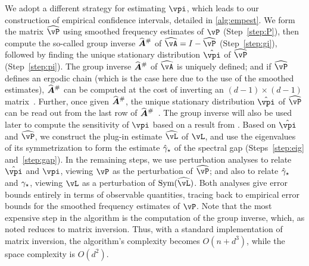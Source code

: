 We adopt a different strategy for estimating $\vpi$, which leads to
our construction of empirical confidence intervals, detailed in
\cref{alg:empest}.
We form the matrix $\wh\vP$ using smoothed frequency estimates of
$\vP$ (Step~\ref{step:P}), then compute the so-called group inverse
$\giAh$ of $\wh\vA = I - \wh\vP$ (Step~\ref{step:gi}), followed by
finding the unique stationary distribution $\hat\vpi$ of $\wh\vP$
(Step~\ref{step:pi}).
The group inverse $\giAh$ of $\wh\vA$ is uniquely defined; and if
$\wh\vP$ defines an ergodic chain (which is the case here due to the
use of the smoothed estimates), $\giAh$ can be computed at the cost of
inverting an $(d-1)\times (d-1)$ matrix~\citep[Theorem
5.2]{meyer1975role}.
Further, once given $\giAh$, the unique stationary distribution
$\hat\vpi$ of $\wh\vP$ can be read out from the last row of
$\giAh$~\citep[Theorem 5.3]{meyer1975role}.
The group inverse will also be used later to compute the sensitivity
of $\vpi$ based on a result from \cite{cho2001comparison}.
Based on $\hat\vpi$ and $\wh\vP$, we construct the plug-in estimate
$\wh\vL$ of $\vL$, and use the eigenvalues of its symmetrization to
form the estimate $\hat\gamma_{\star}$ of the spectral gap (Steps~\ref{step:eig}
and~\ref{step:gap}).
In the remaining steps, 
we use perturbation analyses to relate $\hat\vpi$ and $\vpi$, viewing
$\vP$ as the perturbation of $\wh\vP$; and also to relate $\hat\gamma_{\star}$
and $\gamma_{\star}$, viewing $\vL$ as a perturbation of $\Sym(\wh\vL)$.
Both analyses give error bounds entirely in terms of observable
quantities, tracing back to empirical error bounds for the smoothed
frequency estimates of $\vP$.
Note that the most expensive step in the algorithm is the computation of the group inverse,
which, as noted reduces to matrix inversion.
Thus, with a standard implementation of matrix inversion, the algorithm's complexity becomes 
$O( n + d^3)$, while the space complexity is $O(d^2)$.

